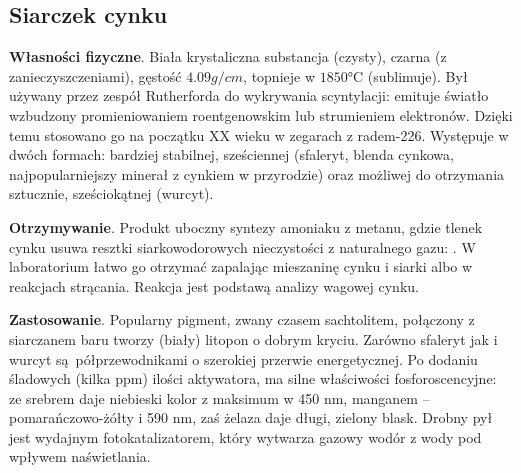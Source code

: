 \subsection{Siarczek cynku }
\textbf{Własności fizyczne}.
Biała krystaliczna substancja (czysty), czarna (z zanieczyszczeniami), gęstość $4.09 \si{g \per cm}$, topnieje w $1850 \si{\celsius}$ (sublimuje).
Był używany przez zespół Rutherforda do wykrywania scyntylacji: emituje światło wzbudzony promieniowaniem roentgenowskim lub strumieniem elektronów.
Dzięki temu stosowano go na początku XX wieku w zegarach z radem-226.
Występuje w dwóch formach: bardziej stabilnej, sześciennej (sfaleryt, blenda cynkowa, najpopularniejszy minerał z cynkiem w przyrodzie) oraz możliwej do otrzymania sztucznie, sześciokątnej (wurcyt).


\textbf{Otrzymywanie}.
Produkt uboczny syntezy amoniaku z metanu, gdzie tlenek cynku usuwa resztki siarkowodorowych nieczystości z naturalnego gazu: .  
W laboratorium łatwo go otrzymać zapalając mieszaninę cynku i siarki albo w reakcjach strącania.
Reakcja  jest podstawą analizy wagowej cynku.

\textbf{Zastosowanie}.
Popularny pigment, zwany czasem sachtolitem, połączony z siarczanem baru tworzy (biały) litopon o dobrym kryciu.
Zarówno sfaleryt jak i wurcyt są półprzewodnikami o szerokiej przerwie energetycznej.
Po dodaniu śladowych (kilka ppm) ilości aktywatora, ma silne właściwości fosforoscencyjne: ze srebrem daje niebieski kolor z maksimum w 450 nm, manganem -- pomarańczowo-żółty i 590 nm, zaś żelaza daje długi, zielony blask.
Drobny pył jest wydajnym fotokatalizatorem, który wytwarza gazowy wodór z wody pod wpływem naświetlania.
